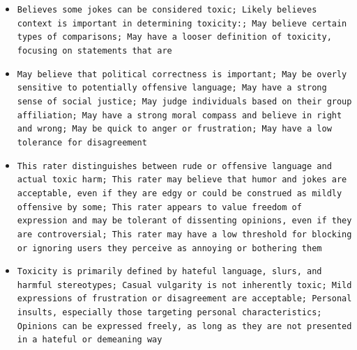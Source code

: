 \documentclass[11pt]{article}
\begin{document}
\begin{itemize}
\item \texttt{Believes some jokes can be considered toxic; Likely believes context is important in determining toxicity:; May believe certain types of comparisons; May have a looser definition of toxicity, focusing on statements that are}
\item \texttt{May believe that political correctness is important; May be overly sensitive to potentially offensive language; May have a strong sense of social justice; May judge individuals based on their group affiliation; May have a strong moral compass and believe in right and wrong; May be quick to anger or frustration; May have a low tolerance for disagreement}
\item \texttt{This rater distinguishes between rude or offensive language and actual toxic harm; This rater may believe that humor and jokes are acceptable, even if they are edgy or could be construed as mildly offensive by some; This rater appears to value freedom of expression and may be tolerant of dissenting opinions, even if they are controversial; This rater may have a low threshold for blocking or ignoring users they perceive as annoying or bothering them}
\item \texttt{Toxicity is primarily defined by hateful language, slurs, and harmful stereotypes; Casual vulgarity is not inherently toxic; Mild expressions of frustration or disagreement are acceptable; Personal insults, especially those targeting personal characteristics; Opinions can be expressed freely, as long as they are not presented in a hateful or demeaning way}
\end{itemize}
\end{document}
